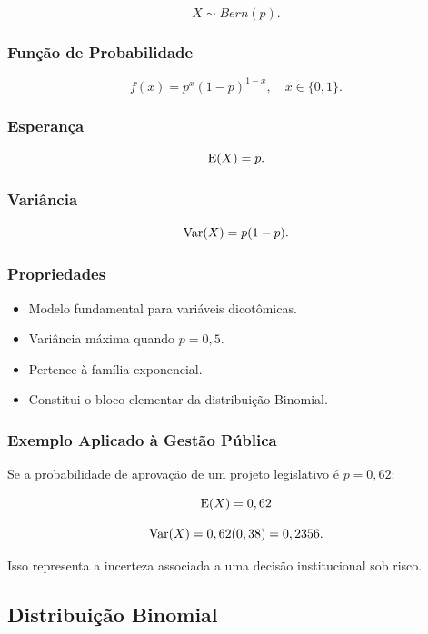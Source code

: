 \[
X \sim Bern(p).
\]

\subsubsection*{Função de Probabilidade}

\[
f(x) = p^x (1-p)^{1-x}, \quad x \in \{0,1\}.
\]

\subsubsection*{Esperança}

\[
\operatorname{E}(X)=p.
\]

\subsubsection*{Variância}

\[
\operatorname{Var}(X)=p(1-p).
\]

\subsubsection*{Propriedades}

\begin{itemize}
\item Modelo fundamental para variáveis dicotômicas.
\item Variância máxima quando $p=0,5$.
\item Pertence à família exponencial.
\item Constitui o bloco elementar da distribuição Binomial.
\end{itemize}

\subsubsection*{Exemplo Aplicado à Gestão Pública}

Se a probabilidade de aprovação de um projeto legislativo é $p=0,62$:

\[
\operatorname{E}(X)=0,62
\]

\[
\operatorname{Var}(X)=0,62(0,38)=0,2356.
\]

Isso representa a incerteza associada a uma decisão institucional sob risco.


\newpage
\subsection{Distribuição Binomial}

